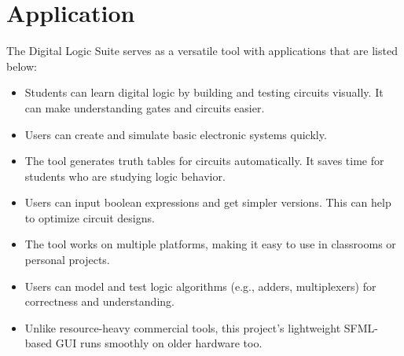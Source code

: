 \section{Application}
The Digital Logic Suite serves as a versatile tool with applications that are listed below:

\begin{itemize}
    \item  Students can learn digital logic by building and testing circuits visually. It can make understanding gates and circuits easier.

    \item  Users can create and simulate basic electronic systems quickly.

    \item  The tool generates truth tables for circuits automatically. It saves time for students who are studying logic behavior.

    \item  Users can input boolean expressions and get simpler versions. This can help to optimize circuit designs.

    \item  The tool works on multiple platforms, making it easy to use in classrooms or personal projects.

    \item  Users can model and test logic algorithms (e.g., adders, multiplexers) for correctness and understanding.

    \item  Unlike resource-heavy commercial tools, this project's lightweight SFML-based GUI runs smoothly on older hardware too.

\end{itemize}
\clearpage